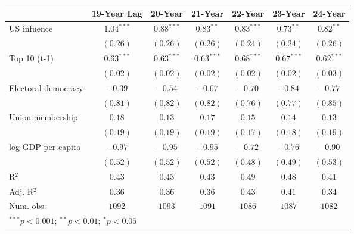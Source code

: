
\begin{table}
\begin{center}
\begin{tabular}{l c c c c c c}
\toprule
 & 19-Year Lag & 20-Year & 21-Year & 22-Year & 23-Year & 24-Year \\
\midrule
US infuence         & $\mathbf{1.04}^{***}$ & $\mathbf{0.88}^{***}$ & $\mathbf{0.83}^{**}$  & $\mathbf{0.83}^{***}$ & $\mathbf{0.73}^{**}$  & $\mathbf{0.82}^{**}$  \\
                    & $(0.26)$              & $(0.26)$              & $(0.26)$              & $(0.24)$              & $(0.24)$              & $(0.26)$              \\
Top 10 (t-1)        & $\mathbf{0.63}^{***}$ & $\mathbf{0.63}^{***}$ & $\mathbf{0.63}^{***}$ & $\mathbf{0.68}^{***}$ & $\mathbf{0.67}^{***}$ & $\mathbf{0.62}^{***}$ \\
                    & $(0.02)$              & $(0.02)$              & $(0.02)$              & $(0.02)$              & $(0.02)$              & $(0.03)$              \\
Electoral democracy & $-0.39$               & $-0.54$               & $-0.67$               & $-0.70$               & $-0.84$               & $-0.77$               \\
                    & $(0.81)$              & $(0.82)$              & $(0.82)$              & $(0.76)$              & $(0.77)$              & $(0.85)$              \\
Union membership    & $0.18$                & $0.13$                & $0.17$                & $0.15$                & $0.14$                & $0.13$                \\
                    & $(0.19)$              & $(0.19)$              & $(0.19)$              & $(0.17)$              & $(0.18)$              & $(0.19)$              \\
log GDP per capita  & $-0.97$               & $-0.95$               & $-0.95$               & $-0.72$               & $-0.76$               & $-0.90$               \\
                    & $(0.52)$              & $(0.52)$              & $(0.52)$              & $(0.48)$              & $(0.49)$              & $(0.53)$              \\
\midrule
R$^2$               & $0.43$                & $0.43$                & $0.43$                & $0.49$                & $0.48$                & $0.41$                \\
Adj. R$^2$          & $0.36$                & $0.36$                & $0.36$                & $0.43$                & $0.41$                & $0.34$                \\
Num. obs.           & $1092$                & $1093$                & $1091$                & $1086$                & $1087$                & $1082$                \\
\bottomrule
\multicolumn{7}{l}{\scriptsize{$^{***}p<0.001$; $^{**}p<0.01$; $^{*}p<0.05$}}
\end{tabular}
\label{table:coefficients}
\end{center}
\end{table}

